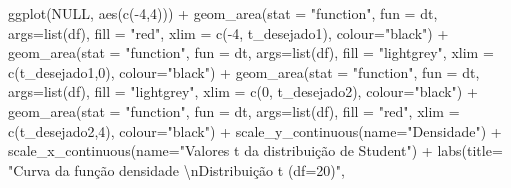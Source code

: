 \documentclass[
]{book}
\newenvironment{Shaded}{\begin{snugshade}}{\end{snugshade}}
\newcommand{\AttributeTok}[1]{\textcolor[rgb]{0.77,0.63,0.00}{#1}}
\newcommand{\ConstantTok}[1]{\textcolor[rgb]{0.00,0.00,0.00}{#1}}
\newcommand{\DecValTok}[1]{\textcolor[rgb]{0.00,0.00,0.81}{#1}}
\newcommand{\FunctionTok}[1]{\textcolor[rgb]{0.00,0.00,0.00}{#1}}
\newcommand{\NormalTok}[1]{#1}
\newcommand{\SpecialCharTok}[1]{\textcolor[rgb]{0.00,0.00,0.00}{#1}}
\newcommand{\StringTok}[1]{\textcolor[rgb]{0.31,0.60,0.02}{#1}}
\begin{document}
\begin{Shaded}
\begin{Highlighting}[]
\FunctionTok{ggplot}\NormalTok{(}\ConstantTok{NULL}\NormalTok{, }\FunctionTok{aes}\NormalTok{(}\FunctionTok{c}\NormalTok{(}\SpecialCharTok{{-}}\DecValTok{4}\NormalTok{,}\DecValTok{4}\NormalTok{))) }\SpecialCharTok{+}
  \FunctionTok{geom\_area}\NormalTok{(}\AttributeTok{stat =} \StringTok{"function"}\NormalTok{, }
            \AttributeTok{fun =}\NormalTok{ dt,}
            \AttributeTok{args=}\FunctionTok{list}\NormalTok{(df), }
            \AttributeTok{fill =} \StringTok{"red"}\NormalTok{, }
            \AttributeTok{xlim =} \FunctionTok{c}\NormalTok{(}\SpecialCharTok{{-}}\DecValTok{4}\NormalTok{, t\_desejado1),}
            \AttributeTok{colour=}\StringTok{"black"}\NormalTok{) }\SpecialCharTok{+}
  \FunctionTok{geom\_area}\NormalTok{(}\AttributeTok{stat =} \StringTok{"function"}\NormalTok{, }
            \AttributeTok{fun =}\NormalTok{ dt, }
            \AttributeTok{args=}\FunctionTok{list}\NormalTok{(df), }
            \AttributeTok{fill =} \StringTok{"lightgrey"}\NormalTok{, }
            \AttributeTok{xlim =} \FunctionTok{c}\NormalTok{(t\_desejado1,}\DecValTok{0}\NormalTok{),}
            \AttributeTok{colour=}\StringTok{"black"}\NormalTok{) }\SpecialCharTok{+}
  \FunctionTok{geom\_area}\NormalTok{(}\AttributeTok{stat =} \StringTok{"function"}\NormalTok{, }
            \AttributeTok{fun =}\NormalTok{ dt, }
            \AttributeTok{args=}\FunctionTok{list}\NormalTok{(df), }
            \AttributeTok{fill =} \StringTok{"lightgrey"}\NormalTok{, }
            \AttributeTok{xlim =} \FunctionTok{c}\NormalTok{(}\DecValTok{0}\NormalTok{, t\_desejado2),}
            \AttributeTok{colour=}\StringTok{"black"}\NormalTok{) }\SpecialCharTok{+}
  \FunctionTok{geom\_area}\NormalTok{(}\AttributeTok{stat =} \StringTok{"function"}\NormalTok{, }
            \AttributeTok{fun =}\NormalTok{ dt, }
            \AttributeTok{args=}\FunctionTok{list}\NormalTok{(df), }
            \AttributeTok{fill =} \StringTok{"red"}\NormalTok{, }
            \AttributeTok{xlim =} \FunctionTok{c}\NormalTok{(t\_desejado2,}\DecValTok{4}\NormalTok{),}
            \AttributeTok{colour=}\StringTok{"black"}\NormalTok{) }\SpecialCharTok{+}
  \FunctionTok{scale\_y\_continuous}\NormalTok{(}\AttributeTok{name=}\StringTok{"Densidade"}\NormalTok{) }\SpecialCharTok{+}
  \FunctionTok{scale\_x\_continuous}\NormalTok{(}\AttributeTok{name=}\StringTok{"Valores \textasciigrave{}\textasciigrave{}t\textquotesingle{}\textquotesingle{} da distribuição de Student"}\NormalTok{)  }\SpecialCharTok{+}
  \FunctionTok{labs}\NormalTok{(}\AttributeTok{title=} \StringTok{"Curva da função densidade }\SpecialCharTok{\textbackslash{}n}\StringTok{Distribuição t (df=20)"}\NormalTok{, }

\end{Highlighting}
\end{Shaded}
\end{document}
